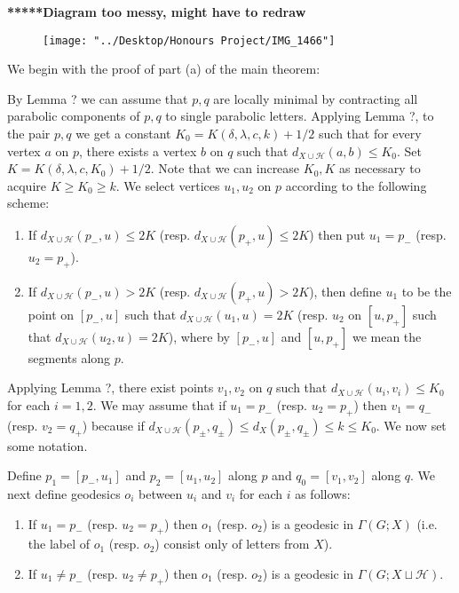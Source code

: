 \documentclass[12pt]{article}
\newcommand{\vs}{\vskip10pt}
\begin{document}
\textbf{*****Diagram too messy, might have to redraw}

\begin{figure} [h]
	\centering
	\texttt{[image: "../Desktop/Honours Project/IMG\_1466"]}
	\caption{}
	\label{fig:img1466}
\end{figure}

	We begin with the proof of part (a) of the main theorem: 
	
	\vs
	
	By Lemma ? we can assume that $p,q$ are locally minimal by contracting all parabolic components of $p,q$ to single parabolic letters. Applying Lemma ?, to the pair $p,q$ we get a constant $K_0 = K(\delta, \lambda, c, k) + 1/2$ such that for every vertex $a$ on $p$, there exists a vertex $b$ on $q$ such that $d_{X \cup \mathcal{H}}(a,b) \leq K_0$. Set $K = K(\delta, \lambda, c, K_0) + 1/2$. Note that we can increase $K_0, K$ as necessary to acquire $K \geq K_0 \geq k$. We select vertices $u_1, u_2$ on $p$ according to the following scheme: 
	
	\begin{enumerate}[label = (\roman*)]
		\item If $d_{X \cup \mathcal{H}}(p_-, u) \leq 2K$ (resp. $d_{X \cup \mathcal{H}}(p_+, u) \leq 2K$) then put $u_1 = p_-$ (resp. $u_2 = p_+$). 
		\item If $d_{X \cup \mathcal{H}}(p_-, u) > 2K$ (resp. $d_{X \cup \mathcal{H}}(p_+, u)> 2K$), then define $u_1$ to be the point on $[p_-, u]$ such that $d_{X \cup \mathcal{H}}(u_1, u) = 2K$ (resp. $u_2$ on $[u, p_+]$ such that $d_{X \cup \mathcal{H}}(u_2, u) = 2K$), where by $[p_-, u]$ and $[u, p_+]$ we mean the segments along $p$. 
	\end{enumerate}

	Applying Lemma ?, there exist points $v_1, v_2$ on $q$ such that $d_{X \cup \mathcal{H}}(u_i, v_i) \leq K_0$ for each $i = 1,2$. We may assume that if $u_1 = p_-$ (resp. $u_2 = p_+$) then $v_1 = q_-$ (resp. $v_2 = q_+$) because if $d_{X \cup \mathcal{H}}(p_{\pm}, q_{\pm}) \leq d_X(p_{\pm}, q_{\pm}) \leq k \leq K_0$. We now set some notation.
	
	\vs 
	
	Define $p_1 = [p_-, u_1]$ and $p_2 = [u_1, u_2]$ along $p$ and $q_0 = [v_1, v_2]$ along $q$. We next define geodesics $o_i$ between $u_i$ and $v_i$ for each $i$ as follows: 
	
	\begin{enumerate} [label = (\roman*)]
		\item If $u_1 = p_-$ (resp. $u_2 = p_+$) then $o_1$ (resp. $o_2$) is a geodesic in $\Gamma(G; X)$ (i.e. the label of $o_1$ (resp. $o_2$) consist only of letters from $X$).
		\item If $u_1 \neq p_-$ (resp. $u_2 \neq p_+$) then $o_1$ (resp. $o_2$) is a geodesic in $\Gamma(G; X \sqcup \mathcal{H})$. 
	\end{enumerate}
\end{document}
